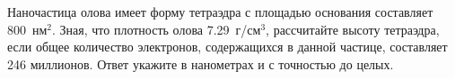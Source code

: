 
Наночастица
олова имеет форму тетраэдра с площадью основания составляет 800~нм$^2$.  Зная, что плотность олова 7.29~г/см$^3$, рассчитайте высоту тетраэдра, если общее количество электронов,
содержащихся в данной частице, составляет 246 миллионов. 
Ответ укажите в нанометрах и с точностью до целых.



